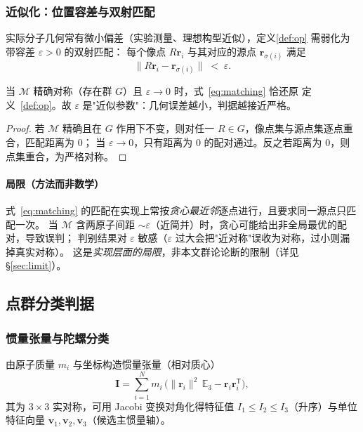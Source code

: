 \subsubsection{近似化：位置容差与双射匹配}
实际分子几何常有微小偏差（实验测量、理想构型近似），定义\eqref{def:op} 需弱化为带容差 $\varepsilon>0$ 的双射匹配：
每个像点 $R\mathbf r_i$ 与其对应的源点 $\mathbf r_{\sigma(i)}$ 满足
\begin{equation}\label{eq:matching}
  \bigl\| R\mathbf r_i-\mathbf r_{\sigma(i)} \bigr\| \;<\;\varepsilon .
\end{equation}
\begin{lemma}[精确情形的极限]\label{lem:epszero}
  当 $\mathcal M$ 精确对称（存在群 $G$）且 $\varepsilon\to 0$ 时，式~\eqref{eq:matching} 恰还原
  定义~\ref{def:op}。故 $\varepsilon$ 是"近似参数"：几何误差越小，判据越接近严格。
\end{lemma}
\begin{proof}
  若 $\mathcal M$ 精确且在 $G$ 作用下不变，则对任一 $R\in G$，像点集与源点集逐点重合，匹配距离为 $0$；
  当 $\varepsilon\to 0$，只有距离为 $0$ 的配对通过。反之若距离为 $0$，则点集重合，为严格对称。\qedhere
\end{proof}

\paragraph{局限（方法而非数学）}
式~\eqref{eq:matching} 的匹配在实现上常按\emph{贪心最近邻}逐点进行，且要求同一源点只匹配一次。
当 $\mathcal M$ 含两原子间距 $\sim\varepsilon$（近简并）时，贪心可能给出非全局最优的配对，导致误判；
判别结果对 $\varepsilon$ 敏感（$\varepsilon$ 过大会把"近对称"误收为对称，过小则漏掉真实对称）。
这是\emph{实现层面的局限}，非本文群论论断的限制（详见 \S\ref{sec:limit}）。

\subsection{点群分类判据}\label{sec:classify}

\subsubsection{惯量张量与陀螺分类}\label{sec:gyro}
由原子质量 $m_i$ 与坐标构造惯量张量（相对质心）
\begin{equation}
  \mathbf I=\sum_{i=1}^{N} m_i\,\bigl(\lVert\mathbf r_i\rVert^2\,\mathbb{E}_3-\mathbf r_i\mathbf r_i^{\mathsf T}\bigr),
\end{equation}
其为 $3\times 3$ 实对称，可用 Jacobi 变换对角化得特征值 $I_1\le I_2\le I_3$（升序）与单位特征向量
$\mathbf v_1,\mathbf v_2,\mathbf v_3$（候选主惯量轴）。

